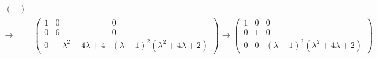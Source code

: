 \begin{solution}
\begin{align*}
\begin{pmatrix}
                     \end{pmatrix}\\
   \longrightarrow &
                      \begin{pmatrix}
                        1 & 0 & 0\\
                        0 & 6 & 0\\
                        0 & -\lambda^2-4\lambda+4 & (\lambda-1)^2(\lambda^2+4\lambda+2)
                      \end{pmatrix}\longrightarrow
                     \begin{pmatrix}
                       1 & 0 & 0\\
                       0 & 1 & 0\\
                       0 & 0 & (\lambda-1)^2(\lambda^2+4\lambda+2)
                     \end{pmatrix}
  \end{align*}
\end{solution}

